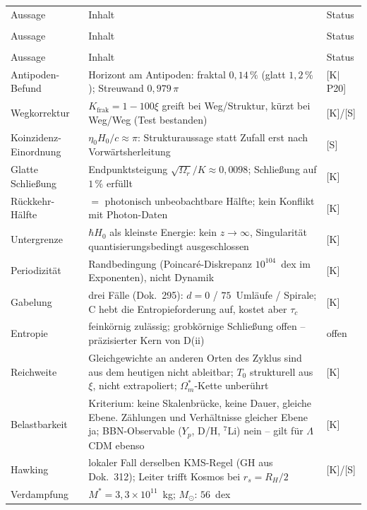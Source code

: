\documentclass[11pt]{report}
\begin{document}
{\small
\begin{longtable}{lp{6.4cm}l}
\toprule
Aussage & Inhalt & Status \\\\
\midrule
\endfirsthead
\toprule
Aussage & Inhalt & Status \\\\
\midrule
\endhead
\bottomrule
\endfoot

Aussage & Inhalt & Status \\
\midrule
Antipoden-Befund & Horizont am Antipoden: fraktal $0{,}14\,\%$
  (glatt $1{,}2\,\%$); Streuwand $0{,}979\,\pi$ & [K$|$P20] \\
Wegkorrektur & $K_\text{frak} = 1-100\xi$ greift bei Weg/Struktur,
  kürzt bei Weg/Weg (Test bestanden) & [K]/[S] \\
Koinzidenz-Einordnung & $\eta_0 H_0/c \approx \pi$: Strukturaussage
  statt Zufall erst nach Vorwärtsherleitung & [S] \\
Glatte Schließung & Endpunktsteigung $\sqrt{\Omega_r}/K
  \approx 0{,}0098$; Schließung auf $1\,\%$ erfüllt & [K] \\
Rückkehr-Hälfte & $=$ photonisch unbeobachtbare Hälfte;
  kein Konflikt mit Photon-Daten & [K] \\
Untergrenze & $\hbar H_0$ als kleinste Energie: kein $z\to\infty$,
  Singularität quantisierungsbedingt ausgeschlossen & [K] \\
Periodizität & Randbedingung (Poincaré-Diskrepanz
  $10^{104}$~dex im Exponenten), nicht Dynamik & [K] \\
Gabelung & drei Fälle (Dok.~295): $d=0$ / $75$~Umläufe / Spirale;
  C hebt die Entropieforderung auf, kostet aber $\tau_c$ & [K] \\
Entropie & feinkörnig zulässig; grobkörnige Schließung offen --
  präzisierter Kern von D(ii) & offen \\
Reichweite & Gleichgewichte an anderen Orten des Zyklus sind aus
  dem heutigen nicht ableitbar; $T_0$ strukturell aus $\xi$, nicht
  extrapoliert; $\Omega_m^{*}$-Kette unberührt & [K] \\
Belastbarkeit & Kriterium: keine Skalenbrücke, keine Dauer, gleiche
  Ebene. Zählungen und Verhältnisse gleicher Ebene ja;
  BBN-Observable ($Y_p$, D/H, ${}^7$Li) nein -- gilt für
  $\Lambda$CDM ebenso & [K] \\
Hawking & lokaler Fall derselben KMS-Regel (GH aus Dok.~312);
  Leiter trifft Kosmos bei $r_s = R_H/2$ & [K]/[S] \\
Verdampfung & $M^{*} = 3{,}3\times10^{11}$~kg; $M_\odot$: $56$~dex

\end{longtable}}
\end{document}
